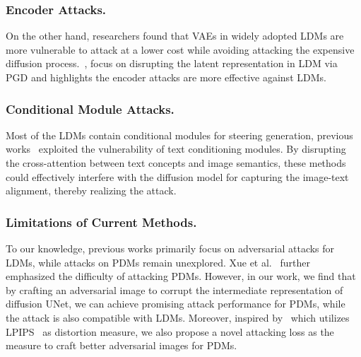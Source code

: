 \subsubsection{Encoder Attacks.}
On the other hand, researchers found that VAEs in widely adopted LDMs are more vulnerable to attack at a lower cost while avoiding attacking the expensive diffusion process.~\cite{salman2023raisingcostmaliciousaipowered, liang2023mistimprovedadversarialexamples, shan2023glazeprotectingartistsstyle, xue2024effectiveprotectiondiffusionbased}, focus on disrupting the latent representation in LDM via PGD and highlights the encoder attacks are more effective against LDMs.

\subsubsection{Conditional Module Attacks.}
Most of the LDMs contain conditional modules for steering generation, previous works~\cite{shan2023glazeprotectingartistsstyle, shan2024nightshadepromptspecificpoisoningattacks, lo2024distraction} exploited the vulnerability of text conditioning modules. By disrupting the cross-attention between text concepts and image semantics, these methods could effectively interfere with the diffusion model for capturing the image-text alignment, thereby realizing the attack.

\subsubsection{Limitations of Current Methods.}
To our knowledge, previous works primarily focus on adversarial attacks for LDMs, while attacks on PDMs remain unexplored. Xue et al.~\cite{xue2024pixelbarrierdiffusionmodels} further emphasized the difficulty of attacking PDMs. However, in our work, we find that by crafting an adversarial image to corrupt the intermediate representation of diffusion UNet, we can achieve promising attack performance for PDMs, 
while the attack is also compatible with LDMs. Moreover, inspired by~\cite{laidlaw2021perceptual, liu2023instruct2attack} which utilizes LPIPS~\cite{zhang2018unreasonable} as distortion measure, we also propose a novel attacking loss as the measure to craft better adversarial images for PDMs.
